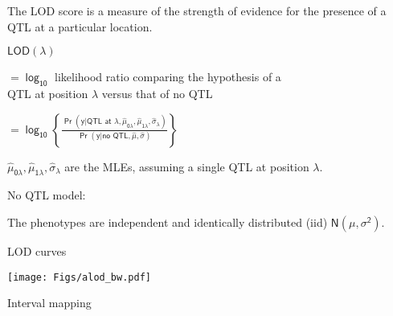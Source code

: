 \documentclass[12pt]{article}
\newcommand{\headsize}{\fontsize{35}{35} \selectfont}
\newcommand{\smallersize}{\fontsize{20}{25} \selectfont}
\newcommand{\lod}{\text{LOD}}
\begin{document}
\hfill
\begin{minipage}{10in}
\color{mywhite} \smallersize
 The LOD score is a measure of the {\color{mypink} strength of
evidence} for the presence of a QTL at a particular
location.
\vspace{15mm}

 $\mathsf{\lod(\lambda)}$
\begin{minipage}[t]{8.5in}
$\mathsf{= \log_{10}}$ likelihood ratio comparing the hypothesis of a \\
\hspace*{8mm} QTL at position $\mathsf{\lambda}$ versus that of no QTL
\vspace{5mm}

\headsize
$\mathsf{= \log_{10} \left\{ \frac{\Pr(y | \text{QTL at $\lambda$}, \hat{\mu}_{0\lambda},
\hat{\mu}_{1\lambda}, \hat{\sigma}_\lambda)}{\Pr(y | \text{no QTL}, \hat{\mu},
\hat{\sigma})} \right\}}$
\end{minipage}
\vspace{15mm}

 $\mathsf{\hat{\mu}_{0\lambda}, \hat{\mu}_{1\lambda}, \hat{\sigma}_\lambda}$ are the MLEs,
assuming a single QTL at position $\mathsf{\lambda}$.
\vspace{15mm}

 No QTL model:
\begin{minipage}[t]{7.5in}
The phenotypes are independent and identically
distributed (iid) $\mathsf{N(\mu, \sigma^2)}$.
\end{minipage}
\end{minipage}







\newpage

\headsize \color{myyellow}
\hfill \begin{minipage}{5.75in}
\centering
LOD curves
\end{minipage}

\vfill

\centerline{\texttt{[image: Figs/alod\_bw.pdf]}}



\newpage

\addtocounter{page}{+1}

\headsize \color{myyellow}
\hfill \begin{minipage}{5.75in}
\centering
Interval mapping
\end{minipage}

\vspace{2cm}
\end{document}
